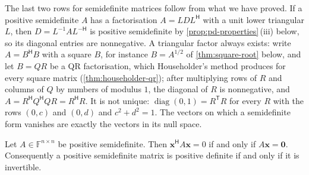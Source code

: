 \begin{table}
\end{table}

The last two rows for semidefinite matrices follow from what we have proved. If a positive semidefinite $A$ has a factorisation $A=LDL^{\mathsf H}$ with a unit lower triangular $L$, then $D=L^{-1}AL^{-\mathsf H}$ is positive semidefinite by \cref{prop:pd-properties}\,(iii) below, so its diagonal entries are nonnegative. A triangular factor always exists: write $A=B^{\mathsf H}B$ with a square $B$, for instance $B=A^{1/2}$ of \cref{thm:square-root} below, and let $B=QR$ be a QR factorisation, which Householder's method produces for every square matrix (\cref{thm:householder-qr}); after multiplying rows of $R$ and columns of $Q$ by numbers of modulus $1$, the diagonal of $R$ is nonnegative, and $A=R^{\mathsf H}Q^{\mathsf H}QR=R^{\mathsf H}R$. It is not unique: $\operatorname{diag}(0,1)=R^{\mathsf T}R$ for every $R$ with the rows $(0,c)$ and $(0,d)$ and $c^2+d^2=1$. The vectors on which a semidefinite form vanishes are exactly the vectors in its null space.

\begin{lemma}
\label{lem:psd-kernel}
Let $A\in\mathbb F^{n\times n}$ be positive semidefinite. Then $\mathbf x^{\mathsf H}A\mathbf x=0$ if and only if $A\mathbf x=\mathbf 0$. Consequently a positive semidefinite matrix is positive definite if and only if it is invertible.
\end{lemma}

